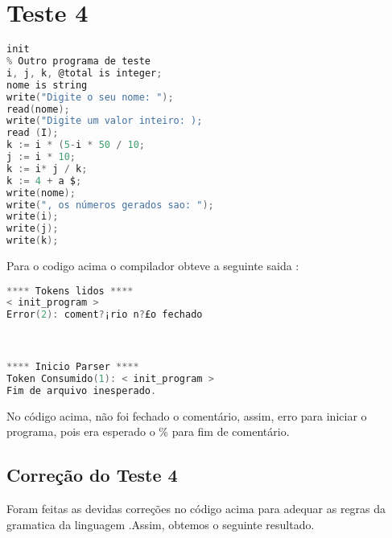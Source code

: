 \section{Teste 4}


\begin{lstlisting}[caption={Teste4.txt},label={lst:label},language=C]
init
% Outro programa de teste
i, j, k, @total is integer;
nome is string
write("Digite o seu nome: ");
read(nome);
write("Digite um valor inteiro: );
read (I);
k := i * (5-i * 50 / 10;
j := i * 10;
k := i* j / k;
k := 4 + a $;
write(nome);
write(", os números gerados sao: ");
write(i);
write(j);
write(k);
\end{lstlisting}

Para o codigo acima o compilador obteve a seguinte saida :

\begin{lstlisting}[caption={Saida para o Codigo de teste  : Teste4.txt},label={Entrada 1},language=C]
**** Tokens lidos ****
< init_program >
Error(2): coment?¡rio n?£o fechado



**** Inicio Parser ****
Token Consumido(1): < init_program >
Fim de arquivo inesperado.


\end{lstlisting}
No código acima, não foi fechado o comentário, assim, erro para iniciar o programa, pois era esperado o {\%} para fim de comentário.


\subsection{Correção do Teste 4}
Foram feitas as devidas correções no código acima para adequar as regras da gramatica da linguagem .Assim, obtemos o seguinte resultado.


